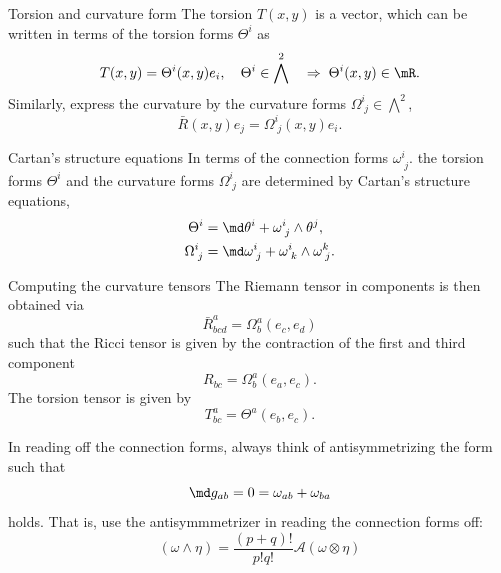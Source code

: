 \begin{mybox}{Torsion and curvature form}
	The torsion $T(x,y)$ is a vector, which can be written in terms of the torsion forms $\Theta^i$ as 
	\begin{equation}
		T(x,y) = \Theta^i(x,y) e_i, \quad \Theta^i \in \bigwedge^2 \quad \Rightarrow \; \Theta^i(x,y) \in \mR.
	\end{equation}
	Similarly, express the curvature by the curvature forms $\Omega^i_{\; j} \in \bigwedge^2$,
	\begin{equation}
		\bar{R}(x,y)e_j = \Omega^i_{\;j}(x,y)e_i.
	\end{equation}
\end{mybox}

\begin{mybox}{Cartan's structure equations}
	In terms of the connection forms $\omega^i_{\; j}$. the torsion forms $\Theta^i$ and the curvature forms $\Omega^i_{\;j}$ are determined by Cartan's structure equations,
	\begin{align}
		\label{eq:cartanStructure}
		\Theta^i &= \md \theta^i + \omega^i_{\;j} \wedge \theta^j,\\
		\Omega^i_{\;j} &= \md \omega^i_{\;j} + \omega^i_{\;k} \wedge \omega^k_{\; j}.
	\end{align}
\end{mybox}
\begin{mybox}{Computing the curvature tensors}
	The Riemann tensor in components is then obtained via
	\begin{equation}
		\bar{R}^a_{bcd} = \Omega^a_b(e_c,e_d)
	\end{equation}
	such that the Ricci tensor is given by the contraction of the first and third component
	\begin{equation}
		R_{bc} = \Omega^a_b(e_a,e_c).
	\end{equation}
	The torsion tensor is given by
	\begin{equation}
		T^a_{bc} = \Theta^a (e_b,e_c).
	\end{equation}
\end{mybox}
In reading off the connection forms, always think of antisymmetrizing the form such that
\begin{equation} 
	\md g_{ab} =0 =\omega_{ab}+\omega_{ba} 
\end{equation}
holds. That is, use the antisymmmetrizer in reading the connection forms off:
\begin{equation}
	(\omega \wedge \eta)=\frac{(p+q)!}{p!q!} \mathcal{A}(\omega\otimes\eta)
\end{equation}
